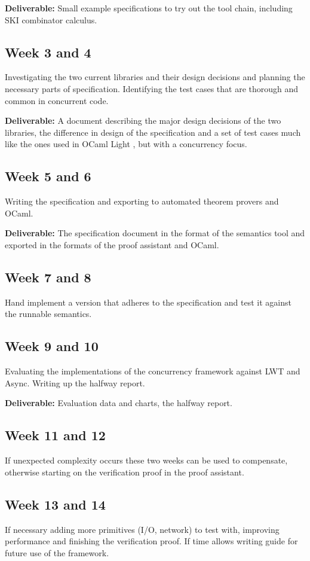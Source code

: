 \textbf{Deliverable:} Small example specifications to try out the tool chain, including SKI combinator calculus.

\subsection{Week 3 and 4}
Investigating the two current libraries and their design decisions and planning the necessary parts of specification. Identifying the test cases that are thorough and common in concurrent code.

\textbf{Deliverable:} A document describing the major design decisions of the two libraries, the difference in design of the specification and a set of test cases much like the ones used in OCaml Light \cite{OCamlLight, OCamlLightWeb}, but with a concurrency focus.

\subsection{Week 5 and 6}
Writing the specification and exporting to automated theorem provers and OCaml.

\textbf{Deliverable:} The specification document in the format of the semantics tool and exported in the formats of the proof assistant and OCaml.


\subsection{Week 7 and 8}
Hand implement a version that adheres to the specification and test it against the runnable semantics.

\subsection{Week 9 and 10}
Evaluating the implementations of the concurrency framework against LWT and Async.
Writing up the halfway report.

\textbf{Deliverable:} Evaluation data and charts, the halfway report.
\subsection{Week 11 and 12}
If unexpected complexity occurs these two weeks can be used to compensate, otherwise starting on the verification proof in the proof assistant.
\subsection{Week 13 and 14}
If necessary adding more primitives (I/O, network) to test with, improving performance and finishing the verification proof. If time allows writing guide for future use of the framework.
